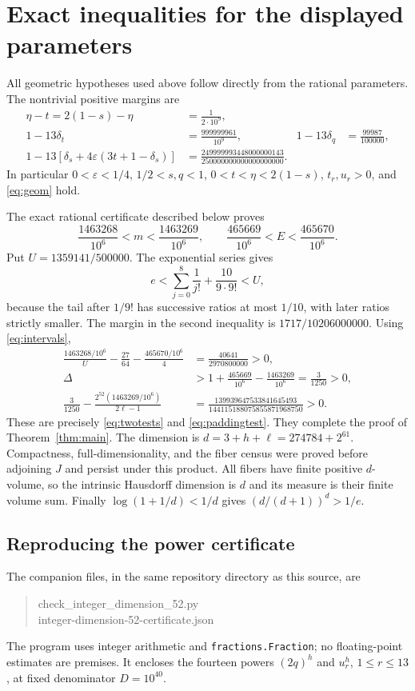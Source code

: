 \documentclass[11pt]{article}
\begin{document}
\section{Exact inequalities for the displayed parameters}
All geometric hypotheses used above follow directly from the rational
parameters. The nontrivial positive margins are
\begin{align*}
 \eta-t=2(1-s)-\eta&=\frac1{2\cdot10^9},\\
 1-13\delta_t&=\frac{999999961}{10^9},&
 1-13\delta_q&=\frac{99987}{100000},\\
 1-13[\delta_s+4\varepsilon(3t+1-\delta_s)]
 &=\frac{249999993448000000143}{250000000000000000000}.
\end{align*}
In particular $0<\varepsilon<1/4$, $1/2<s,q<1$, $0<t<\eta<2(1-s)$,
$t_r,u_r>0$, and \eqref{eq:geom} hold.

The exact rational certificate described below proves
\begin{equation}\label{eq:intervals}
 \frac{1463268}{10^6}<m<\frac{1463269}{10^6},\qquad
 \frac{465669}{10^6}<E<\frac{465670}{10^6}.
\end{equation}
Put $U=1359141/500000$. The exponential series gives
\[
 e<\sum_{j=0}^8\frac1{j!}+\frac{10}{9\cdot9!}<U,
\]
because the tail after $1/9!$ has successive ratios at most $1/10$,
with later ratios strictly smaller. The margin in the second inequality
is $1717/10206000000$. Using \eqref{eq:intervals},
\begin{align*}
 \frac{1463268/10^6}{U}-\frac{27}{64}-\frac{465670/10^6}{4}
   &=\frac{40641}{2970800000}>0,\\
 \Delta&>1+\frac{465669}{10^6}-\frac{1463269}{10^6}
       =\frac3{1250}>0,\\
 \frac3{1250}-\frac{2^{52}(1463269/10^6)}{2\ell-1}
   &=\frac{139939647533841645493}{144115188075855871968750}>0.
\end{align*}
These are precisely \eqref{eq:twotests} and \eqref{eq:paddingtest}. They
complete the proof of Theorem~\ref{thm:main}. The dimension is
$d=3+h+\ell=274784+2^{61}$. Compactness, full-dimensionality, and the
fiber census were proved before adjoining $J$ and persist under this
product. All fibers have finite positive $d$-volume, so the intrinsic
Hausdorff dimension is $d$ and its measure is their finite volume sum.
Finally $\log(1+1/d)<1/d$ gives $(d/(d+1))^d>1/e$.

\subsection*{Reproducing the power certificate}
The companion files, in the same repository directory as this source, are
\begin{quote}\small\ttfamily
check\_integer\_dimension\_52.py\\
integer-dimension-52-certificate.json
\end{quote}
The program uses integer arithmetic and
\texttt{fractions.Fraction}; no floating-point estimates are premises.
It encloses the fourteen powers $(2q)^h$ and $u_r^h$, $1\le r\le13$,
at fixed denominator $D=10^{40}$.
\end{document}
